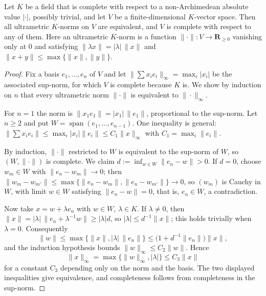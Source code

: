 \begin{lemma}\label{lem:norm-equivalence-complete}
Let $K$ be a field that is complete with respect to a non-Archimedean
absolute value $|\cdot|$, possibly trivial, and let $V$ be a
finite-dimensional $K$-vector space. Then all ultrametric $K$-norms on
$V$ are equivalent, and $V$ is complete with respect to any of them.
Here an ultrametric $K$-norm is a function
$\|\cdot\|:V\to\mathbf R_{\geq0}$ vanishing only at $0$ and satisfying
$\|\lambda x\|=|\lambda|\,\|x\|$ and
$\|x+y\|\leq\max\{\|x\|,\|y\|\}$.
\end{lemma}
\begin{proof}
Fix a basis $e_1,\ldots,e_n$ of $V$ and let
$\|\sum x_ie_i\|_\infty=\max_i|x_i|$ be the associated sup-norm, for
which $V$ is complete because $K$ is. We show by induction on $n$ that
every ultrametric norm $\|\cdot\|$ is equivalent to $\|\cdot\|_\infty$.

For $n=1$ the norm is $\|x_1e_1\|=|x_1|\,\|e_1\|$, proportional to the
sup-norm. Let $n\geq2$ and put $W=\operatorname{span}(e_1,\ldots,e_{n-1})$.
One inequality is general:
$\|\sum x_ie_i\|\leq\max_i|x_i|\|e_i\|\leq C_1\|x\|_\infty$ with
$C_1=\max_i\|e_i\|$.

By induction, $\|\cdot\|$ restricted to $W$ is equivalent to the sup-norm
of $W$, so $(W,\|\cdot\|)$ is complete. We claim
$d:=\inf_{w\in W}\|e_n-w\|>0$. If $d=0$, choose $w_m\in W$ with
$\|e_n-w_m\|\to0$; then
$\|w_m-w_{m'}\|\leq\max\{\|e_n-w_m\|,\|e_n-w_{m'}\|\}\to0$, so $(w_m)$ is
Cauchy in $W$, with limit $w\in W$ satisfying $\|e_n-w\|=0$, that is,
$e_n\in W$, a contradiction.

Now take $x=w+\lambda e_n$ with $w\in W$, $\lambda\in K$. If
$\lambda\neq0$, then
$\|x\|=|\lambda|\,\|e_n+\lambda^{-1}w\|\geq|\lambda|d$, so
$|\lambda|\leq d^{-1}\|x\|$; this holds trivially when $\lambda=0$.
Consequently
\[
 \|w\|\leq\max\{\|x\|,|\lambda|\,\|e_n\|\}
 \leq\bigl(1+d^{-1}\|e_n\|\bigr)\|x\|,
\]
and the induction hypothesis bounds $\|w\|_{\infty}\leq C_2\|w\|$. Hence
\[
 \|x\|_\infty=\max\{\|w\|_\infty,|\lambda|\}
 \leq C_3\|x\|
\]
for a constant $C_3$ depending only on the norm and the basis. The two
displayed inequalities give equivalence, and completeness follows from
completeness in the sup-norm.
\end{proof}

